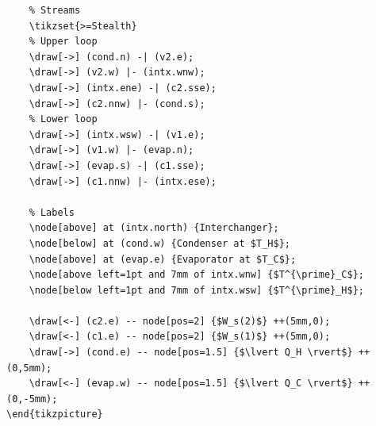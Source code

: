 \documentclass[11pt]{article}
\begin{document}
\begin{enumerate}[resume*]
\begin{lstlisting}
	% Streams
	\tikzset{>=Stealth} 
	% Upper loop
	\draw[->] (cond.n) -| (v2.e);
	\draw[->] (v2.w) |- (intx.wnw);
	\draw[->] (intx.ene) -| (c2.sse);
	\draw[->] (c2.nnw) |- (cond.s);
	% Lower loop
	\draw[->] (intx.wsw) -| (v1.e);
	\draw[->] (v1.w) |- (evap.n);
	\draw[->] (evap.s) -| (c1.sse);
	\draw[->] (c1.nnw) |- (intx.ese);
	
	% Labels
	\node[above] at (intx.north) {Interchanger};
	\node[below] at (cond.w) {Condenser at $T_H$};
	\node[above] at (evap.e) {Evaporator at $T_C$};
	\node[above left=1pt and 7mm of intx.wnw] {$T^{\prime}_C$};
	\node[below left=1pt and 7mm of intx.wsw] {$T^{\prime}_H$};
	
	\draw[<-] (c2.e) -- node[pos=2] {$W_s(2)$} ++(5mm,0);
	\draw[<-] (c1.e) -- node[pos=2] {$W_s(1)$} ++(5mm,0);
	\draw[->] (cond.e) -- node[pos=1.5] {$\lvert Q_H \rvert$} ++(0,5mm);
	\draw[<-] (evap.w) -- node[pos=1.5] {$\lvert Q_C \rvert$} ++(0,-5mm);
\end{tikzpicture}
	\end{lstlisting}
\end{enumerate}
\end{document}
